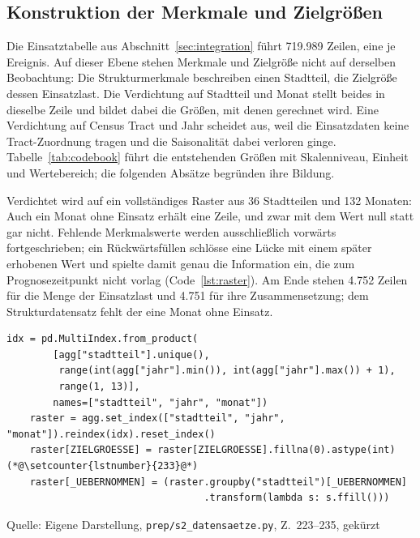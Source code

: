 \documentclass[12pt,a4paper]{article}
\newcommand{\tabquelle}[1][Eigene Darstellung]{%
  \par\setlength{\parskip}{0pt}\vspace{3pt}%
  {\setstretch{1}\fontsize{9pt}{11pt}\selectfont\raggedright Quelle: #1\par}%
}
\begin{document}
\subsection{Konstruktion der Merkmale und Zielgrößen}
\label{sec:merkmale}
Die Einsatztabelle aus Abschnitt~\ref{sec:integration} führt 719.989 Zeilen,
eine je Ereignis. Auf dieser Ebene stehen Merkmale und Zielgröße nicht auf
derselben Beobachtung: Die Strukturmerkmale beschreiben einen Stadtteil, die
Zielgröße dessen Einsatzlast. Die Verdichtung auf Stadtteil und Monat stellt
beides in dieselbe Zeile und bildet dabei die Größen, mit denen gerechnet wird.
Eine Verdichtung auf Census Tract und Jahr scheidet aus, weil die Einsatzdaten
keine Tract-Zuordnung tragen und die Saisonalität dabei verloren ginge.
Tabelle~\ref{tab:codebook} führt die entstehenden Größen mit Skalenniveau,
Einheit und Wertebereich; die folgenden Absätze begründen ihre Bildung.
 
Verdichtet wird auf ein vollständiges Raster aus 36 Stadtteilen und 132
Monaten: Auch ein Monat ohne Einsatz erhält eine Zeile, und zwar mit dem Wert
null statt gar nicht. Fehlende Merkmalswerte werden ausschließlich vorwärts
fortgeschrieben; ein Rückwärtsfüllen schlösse eine Lücke mit einem später
erhobenen Wert und spielte damit genau die Information ein, die zum
Prognosezeitpunkt nicht vorlag (Code~\ref{lst:raster}). Am Ende stehen
4.752 Zeilen für die Menge der Einsatzlast und
4.751 für ihre Zusammensetzung; dem Strukturdatensatz fehlt der eine Monat ohne
Einsatz.
 
\begin{quellcode}[htbp]
\caption{Vollständiges Raster und Vorwärtsfüllen}
\label{lst:raster}\vspace{-3.5pt}
\begin{lstlisting}[style=pythonstil,firstnumber=223]
    idx = pd.MultiIndex.from_product(
        [agg["stadtteil"].unique(),
         range(int(agg["jahr"].min()), int(agg["jahr"].max()) + 1),
         range(1, 13)],
        names=["stadtteil", "jahr", "monat"])
    raster = agg.set_index(["stadtteil", "jahr", "monat"]).reindex(idx).reset_index()
    raster[ZIELGROESSE] = raster[ZIELGROESSE].fillna(0).astype(int)(*@\setcounter{lstnumber}{233}@*)
    raster[_UEBERNOMMEN] = (raster.groupby("stadtteil")[_UEBERNOMMEN]
                                  .transform(lambda s: s.ffill()))
\end{lstlisting}
\tabquelle[Eigene Darstellung, \texttt{prep/s2\_datensaetze.py}, Z.~223--235, gekürzt]
\end{quellcode}
 
\end{document}
